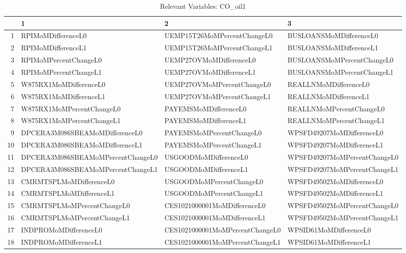 \begin{longtable}{rlll}
\caption{Relevant Variables: CO_oil1} \\ 
  \hline
 & 1 & 2 & 3 \\ 
  \hline
1 & RPIMoMDifferenceL0 & UEMP15T26MoMPercentChangeL0 & BUSLOANSMoMDifferenceL0 \\ 
  2 & RPIMoMDifferenceL1 & UEMP15T26MoMPercentChangeL1 & BUSLOANSMoMDifferenceL1 \\ 
  3 & RPIMoMPercentChangeL0 & UEMP27OVMoMDifferenceL0 & BUSLOANSMoMPercentChangeL0 \\ 
  4 & RPIMoMPercentChangeL1 & UEMP27OVMoMDifferenceL1 & BUSLOANSMoMPercentChangeL1 \\ 
  5 & W875RX1MoMDifferenceL0 & UEMP27OVMoMPercentChangeL0 & REALLNMoMDifferenceL0 \\ 
  6 & W875RX1MoMDifferenceL1 & UEMP27OVMoMPercentChangeL1 & REALLNMoMDifferenceL1 \\ 
  7 & W875RX1MoMPercentChangeL0 & PAYEMSMoMDifferenceL0 & REALLNMoMPercentChangeL0 \\ 
  8 & W875RX1MoMPercentChangeL1 & PAYEMSMoMDifferenceL1 & REALLNMoMPercentChangeL1 \\ 
  9 & DPCERA3M086SBEAMoMDifferenceL0 & PAYEMSMoMPercentChangeL0 & WPSFD49207MoMDifferenceL0 \\ 
  10 & DPCERA3M086SBEAMoMDifferenceL1 & PAYEMSMoMPercentChangeL1 & WPSFD49207MoMDifferenceL1 \\ 
  11 & DPCERA3M086SBEAMoMPercentChangeL0 & USGOODMoMDifferenceL0 & WPSFD49207MoMPercentChangeL0 \\ 
  12 & DPCERA3M086SBEAMoMPercentChangeL1 & USGOODMoMDifferenceL1 & WPSFD49207MoMPercentChangeL1 \\ 
  13 & CMRMTSPLMoMDifferenceL0 & USGOODMoMPercentChangeL0 & WPSFD49502MoMDifferenceL0 \\ 
  14 & CMRMTSPLMoMDifferenceL1 & USGOODMoMPercentChangeL1 & WPSFD49502MoMDifferenceL1 \\ 
  15 & CMRMTSPLMoMPercentChangeL0 & CES1021000001MoMDifferenceL0 & WPSFD49502MoMPercentChangeL0 \\ 
  16 & CMRMTSPLMoMPercentChangeL1 & CES1021000001MoMDifferenceL1 & WPSFD49502MoMPercentChangeL1 \\ 
  17 & INDPROMoMDifferenceL0 & CES1021000001MoMPercentChangeL0 & WPSID61MoMDifferenceL0 \\ 
  18 & INDPROMoMDifferenceL1 & CES1021000001MoMPercentChangeL1 & WPSID61MoMDifferenceL1 \\ 

\end{longtable}
